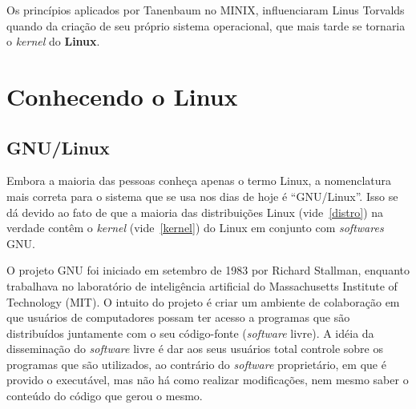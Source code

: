 \documentclass{handout_utfpr}
\begin{document}
Os princípios aplicados por Tanenbaum no MINIX, influenciaram Linus Torvalds quando da criação de seu próprio sistema operacional, que mais tarde se tornaria o \textit{kernel} do \textbf{Linux}.






\section{Conhecendo o Linux}

\subsection{GNU/Linux}
Embora a maioria das pessoas conheça apenas o termo Linux, a nomenclatura mais correta para o sistema que se usa nos dias de hoje é ``GNU/Linux''. Isso se dá devido ao fato de que a maioria das distribuições Linux (vide~\ref{distro}) na verdade contêm o \textit{kernel} (vide~\ref{kernel}) do Linux em conjunto com \textit{softwares} GNU.

O projeto GNU foi iniciado em setembro de 1983 por Richard Stallman, enquanto trabalhava no laboratório de inteligência artificial do Massachusetts Institute of Technology (MIT). O intuito do projeto é criar um ambiente de colaboração em que usuários de computadores possam ter acesso a programas que são distribuídos juntamente com o seu código-fonte (\textit{software} livre). A idéia da disseminação do \textit{software} livre é dar aos seus usuários total controle sobre os programas que são utilizados, ao contrário do \textit{software} proprietário, em que é provido o executável, mas não há como realizar modificações, nem mesmo saber o conteúdo do código que gerou o mesmo.
\end{document}
